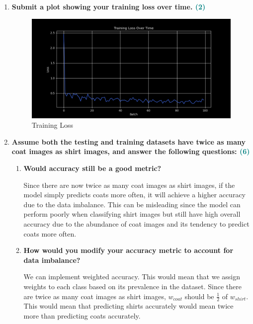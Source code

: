 \documentclass[a4paper]{article}
\begin{document}
\begin{sloppypar}
\begin{enumerate}[start=4,label=Q\arabic*,left=0pt]
    \item \textbf{Submit a plot showing your training loss over time. \hfill \textcolor{teal}{(2)}}

    \begin{figure}[H]
        \centering  
        \includegraphics[height=0.25\textheight]{Q5_training_loss.png}
        \caption{Training Loss}
        \label{fig:Q5_training_loss}
    \end{figure}

    \item \textbf{Assume both the testing and training datasets have twice as many coat images as
    shirt images, and answer the following questions: \hfill \textcolor{teal}{(6)}}
    \begin{enumerate}
        \item \textbf{Would accuracy still be a good metric?}
        
        \par Since there are now twice as many coat images as shirt images, if the model simply predicts 
        coats more often, it will achieve a higher accuracy due to the data imbalance. This can be misleading 
        since the model can perform poorly when classifying shirt images but still have high overall
        accuracy due to the abundance of coat images and its tendency to predict coats more often.

        \item \textbf{How would you modify your accuracy metric to account for data imbalance?}
        
        \par We can implement weighted accuracy. This would mean that we assign weights to each class based on 
        its prevalence in the dataset. Since there are twice as many coat images as shirt images, $w_{coat}$
        should be $\frac{1}{2}$ of $w_{shirt}$. This would mean that predicting shirts accurately would mean twice more
        than predicting coats accurately.


\end{enumerate}
\end{enumerate}
\end{sloppypar}
\end{document}

